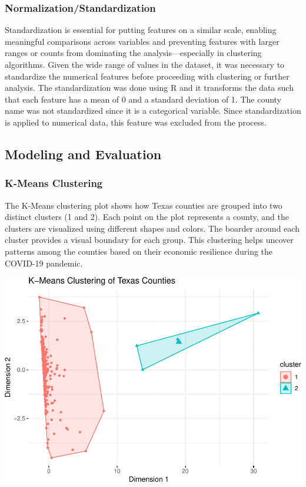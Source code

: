 \documentclass[
]{article}
\begin{document}
\subsubsection{Normalization/Standardization}\label{normalizationstandardization}

Standardization is essential for putting features on a similar scale,
enabling meaningful comparisons across variables and preventing features
with larger ranges or counts from dominating the analysis---especially
in clustering algorithms. Given the wide range of values in the dataset,
it was necessary to standardize the numerical features before proceeding
with clustering or further analysis. The standardization was done using
R and it transforms the data such that each feature has a mean of 0 and
a standard deviation of 1. The county name was not standardized since it
is a categorical variable. Since standardization is applied to numerical
data, this feature was excluded from the process.

\subsection{Modeling and Evaluation}\label{modeling-and-evaluation}

\subsubsection{K-Means Clustering}\label{k-means-clustering}

The K-Means clustering plot shows how Texas counties are grouped into
two distinct clusters (1 and 2). Each point on the plot represents a
county, and the clusters are visualized using different shapes and
colors. The boarder around each cluster provides a visual boundary for
each group. This clustering helps uncover patterns among the counties
based on their economic resilience during the COVID-19 pandemic.

\vspace{10pt}

\includegraphics{Final-Report_files/figure-latex/k-means clustering-1.pdf}
\end{document}
